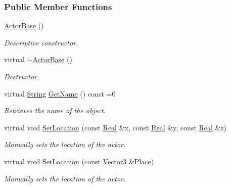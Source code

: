 \subsubsection*{Public Member Functions}
\begin{DoxyCompactItemize}
\item 
\hyperlink{classphys_1_1ActorBase_ab44709e6a5e2ce7b77862978cb1eafb4}{ActorBase} ()
\begin{DoxyCompactList}\small\item\em Descriptive constructor. \item\end{DoxyCompactList}\item 
virtual \hyperlink{classphys_1_1ActorBase_a5e5d4b50c83c6851e554b5e7ad65403f}{$\sim$ActorBase} ()
\begin{DoxyCompactList}\small\item\em Destructor. \item\end{DoxyCompactList}\item 
virtual \hyperlink{namespacephys_aa03900411993de7fbfec4789bc1d392e}{String} \hyperlink{classphys_1_1ActorBase_a1a7a7bc80bf30f142e92f4d29842d274}{GetName} () const =0
\begin{DoxyCompactList}\small\item\em Retrieves the name of the object. \item\end{DoxyCompactList}\item 
virtual void \hyperlink{classphys_1_1ActorBase_ac24dc61c6b6247305df070066f28e8d7}{SetLocation} (const \hyperlink{namespacephys_af7eb897198d265b8e868f45240230d5f}{Real} \&x, const \hyperlink{namespacephys_af7eb897198d265b8e868f45240230d5f}{Real} \&y, const \hyperlink{namespacephys_af7eb897198d265b8e868f45240230d5f}{Real} \&z)
\begin{DoxyCompactList}\small\item\em Manually sets the location of the actor. \item\end{DoxyCompactList}\item 
virtual void \hyperlink{classphys_1_1ActorBase_aa5b6dca6b4ac7bb7ae96ca0ce359ff38}{SetLocation} (const \hyperlink{classphys_1_1Vector3}{Vector3} \&Place)
\begin{DoxyCompactList}\small\item\em Manually sets the location of the actor. \item\end{DoxyCompactList}\item 

\end{DoxyCompactItemize}
